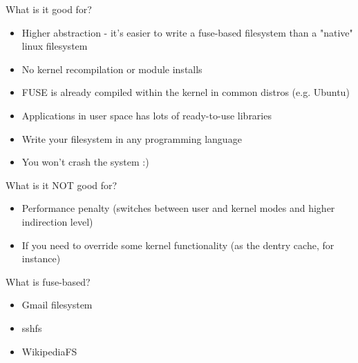 \documentclass{beamer}
\begin{document}
\begin{frame}{What is it good for?}

	\begin{itemize}[<+->]

		\item{Higher abstraction - it's easier to write a fuse-based filesystem than a "native" linux filesystem}

		\item{No kernel recompilation or module installs}
		
		\item{FUSE is already compiled within the kernel in common distros (e.g. Ubuntu)}
	
		\item{Applications in user space has lots of ready-to-use libraries}

		\item{Write your filesystem in any programming language}
		
		\item{You won't crash the system :)}
	
	\end{itemize}

\end{frame}

\begin{frame}{What is it NOT good for?}

	\begin{itemize}[<+->]

		\item{Performance penalty (switches between user and kernel modes and higher indirection level)}

		\item{If you need to override some kernel functionality (as the dentry cache, for instance)}
	
	\end{itemize}

\end{frame}

\begin{frame}{What is fuse-based?}

	\begin{itemize}[<+->]

		\item{Gmail filesystem}\footnotemark[1]
		
		\item{sshfs}\footnotemark[2]
		
		\item{WikipediaFS}\footnotemark[3]
	
	\end{itemize}
	


	
\end{frame}
\end{document}
